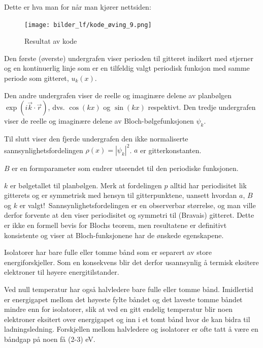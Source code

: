 \documentclass{article}
\begin{document}
Dette er hva man for når man kjører nettsiden:
\begin{figure}[H]
    \centering
    \texttt{[image: bilder\_lf/kode\_øving\_9.png]}
    \caption{Resultat av kode}
    \label{fig:kode_øving_9}
\end{figure}
Den første (øverste) undergrafen viser perioden til gitteret indikert med stjerner og en kontinuerlig linje som er en tilfeldig valgt periodisk funksjon med samme periode som gitteret, $ u_k(x) $.

Den andre undergrafen viser de reelle og imaginære delene av planbølgen $\exp(i \vec{k} \cdot \vec{r}) $, dvs. $ \cos(kx) $ og $ \sin(kx) $ respektivt.
Den tredje undergrafen viser de reelle og imaginære delene av Bloch-bølgefunksjonen $ \psi_k $.

Til slutt viser den fjerde undergrafen den ikke normaliserte sannsynlighetsfordelingen $\rho(x) = |\psi_k|^2 $.
$a$ er gitterkonstanten.

$B$ er en formparameter som endrer utseendet til den periodiske funksjonen.

$k$ er bølgetallet til planbølgen.
Merk at fordelingen $p$ alltid har periodisitet lik gitterets og er symmetrisk med hensyn til gitterpunktene, uansett hvordan $a$, $B$ og $k$ er valgt!\ Sannsynlighetsfordelingen er en observerbar størrelse, og man ville derfor forvente at den viser periodisitet og symmetri til (Bravais) gitteret. Dette er ikke en formell bevis for Blochs teorem, men resultatene er definitivt konsistente og viser at Bloch-funksjonene har de ønskede egenskapene.

\nyside
{}

Isolatorer har bare fulle eller tomme bånd som er separert av store energiforskjeller. Som en konsekvens blir det derfor usannsynlig å termisk eksitere elektroner til høyere energitilstander.

Ved null temperatur har også halvledere bare fulle eller tomme bånd. Imidlertid er energigapet mellom det høyeste fylte båndet og det laveste tomme båndet mindre enn for isolatorer, slik at ved en gitt endelig temperatur blir noen elektroner eksitert over energigapet og inn i et tomt bånd hvor de kan bidra til ladningsledning. Forskjellen mellom halvledere og isolatorer er ofte tatt å være en båndgap på noen få (2-3) eV.
\end{document}
